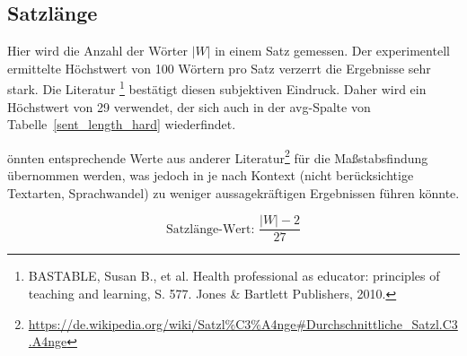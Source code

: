 \documentclass[10pt,a4paper]{article}
\begin{document}
	\subsection*{Satzlänge}
	Hier wird die Anzahl der Wörter $ |W| $ in einem Satz gemessen. Der experimentell ermittelte Höchstwert von 100 Wörtern pro Satz verzerrt die Ergebnisse sehr stark. Die Literatur \footnote{BASTABLE, Susan B., et al. Health professional as educator: principles of teaching and learning, S. 577. Jones \& Bartlett Publishers, 2010.} bestätigt diesen subjektiven Eindruck. Daher wird ein Höchstwert von 29 verwendet, der sich auch in der avg-Spalte von Tabelle~\ref{sent_length_hard} wiederfindet.
	
	önnten entsprechende Werte aus anderer Literatur\footnote{\url{https://de.wikipedia.org/wiki/Satzl\%C3\%A4nge\#Durchschnittliche_Satzl.C3.A4nge}} für die Maßstabsfindung übernommen werden, was jedoch in je nach Kontext (nicht berücksichtige Textarten, Sprachwandel) zu weniger aussagekräftigen Ergebnissen führen könnte.
		
	\begin{equation*}
		\text{Satzlänge-Wert: }\frac{|W|-2}{27}
	\end{equation*}	
	
\end{document}
